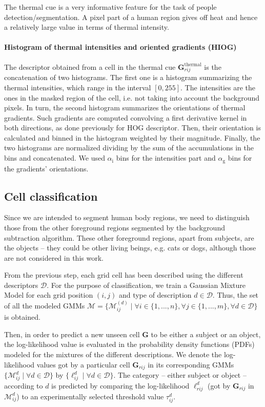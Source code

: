 \documentclass[10pt,twocolumn,letterpaper]{article}
\begin{document}
The thermal cue is a very informative feature for the task of people detection/segmentation. A pixel part of a human region gives off heat and hence a relatively large value in terms of thermal intensity.

\paragraph{Histogram of thermal intensities and oriented gradients (HIOG)} 
The descriptor obtained from a cell in the thermal cue $\mathbf{G}_{rij}^{\mathrm{thermal}}$ is the concatenation of two histograms. The first one is a histogram summarizing the thermal intensities, which range in the interval $[0, 255]$. The intensities are the ones in the masked region of the cell, i.e. not taking into account the background pixels. In turn, the second histogram summarizes the orientations of thermal gradients. Such gradients are computed convolving a first derivative kernel in both directions, as done previously for HOG descriptor. Then, their orientation is calculated and binned in the histogram weighted by their magnitude. Finally, the two histograms are normalized dividing by the sum of the accumulations in the bins and concatenated. We used $\alpha_{\mathrm{i}}$ bins for the intensities part and $\alpha_{\mathrm{g}}$ bins for the gradients' orientations.


\subsection{Cell classification}
Since we are intended to segment human body regions, we need to distinguish those from the other foreground regions segmented by the background subtraction algorithm. These other foreground regions, apart from subjects, are the objects -- they could be other living beings, e.g. cats or dogs, although those are not considered in this work.

From the previous step, each grid cell has been described using the different descriptors $\mathcal{D}$. For the purpose of classification, we train a Gaussian Mixture Model for each grid position $(i,j)$ and type of description $d \in \mathcal{D}$. Thus, the set of all the modeled GMMs $\mathcal{M} = \{\mathcal{M}_{ij}^{(d)} \;|\; \forall i \in \{1,...,n\}, \forall j \in \{1,...,m\}, \forall d \in \mathcal{D} \}$ is obtained.

Then, in order to predict a new unseen cell $\mathbf{G}$ to be either a subject or an object, the log-likelihood value is evaluated in the probability density functions (PDFs) modeled for the mixtures of the different descriptions. We denote the log-likelihood values got by a particular cell $\mathbf{G}_{rij}$ in its corresponding GMMs $\{\mathcal{M}_{ij}^{d} \;|\; \forall d \in \mathcal{D}\}$ by $\{\ell_{ij}^{d} \;|\; \forall d \in \mathcal{D}\}$. The category -- either subject or object -- according to $d$ is predicted by comparing the log-likelihood $\ell_{rij}^{d}$ (got by $\mathbf{G}_{rij}$ in $\mathcal{M}_{ij}^{d}$) to an experimentally selected threshold value $\tau_{ij}^d$. 
\end{document}
